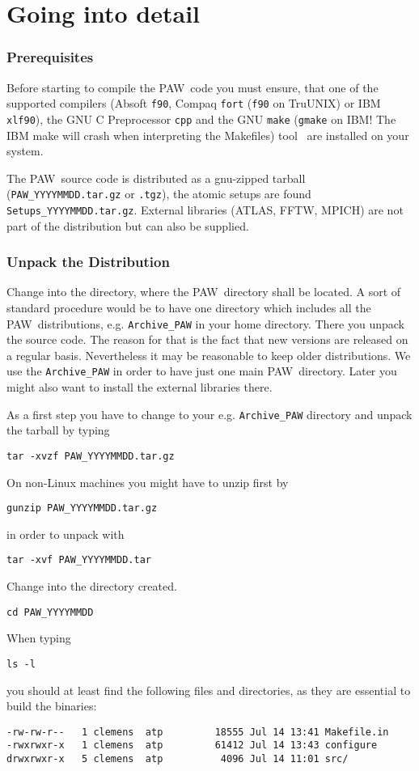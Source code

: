 \documentclass[a4paper,10pt]{article}
\newcommand{\PAW}{\textsc{PAW}}
\begin{document}
\section{Going into detail}

\subsubsection*{Prerequisites}
\label{sub:pre}

Before starting to compile the \PAW\ code you must ensure, that one of the
supported compilers (Absoft \texttt{f90}, Compaq \texttt{fort} (\texttt{f90} on
TruUNIX) or IBM \texttt{xlf90}), the GNU C Preprocessor \texttt{cpp} and the
GNU \texttt{make} (\texttt{gmake} on IBM! The IBM make will crash when
interpreting the Makefiles) tool~\cite{make} are installed on your system.

The \PAW\ source code is distributed as a gnu-zipped tarball
(\texttt{PAW\_YYYYMMDD.tar.gz} or \texttt{.tgz}), the atomic setups are found
\texttt{Setups\_YYYYMMDD.tar.gz}.  External libraries (ATLAS, FFTW, MPICH) are
not part of the distribution but can also be supplied.

\subsubsection*{Unpack the Distribution}
\label{sub:unpack}
Change into the directory, where the \PAW\ directory shall be located.  A sort
of standard procedure would be to have one directory which includes all the
\PAW\ distributions, e.g. \texttt{Archive\_PAW} in your home directory.  There
you unpack the source code.  The reason for that is the fact that new versions
are released on a regular basis. Nevertheless it may be reasonable to keep
older distributions.  We use the \texttt{Archive\_PAW} in order to have just
one main \PAW\ directory.  Later you might also want to install the external
libraries there.


As a first step you have to change to your e.g. \texttt{Archive\_PAW} directory and unpack the tarball by typing
\begin{verbatim}
tar -xvzf PAW_YYYYMMDD.tar.gz
\end{verbatim}
On non-Linux machines you might have to unzip first by
\begin{verbatim}
gunzip PAW_YYYYMMDD.tar.gz
\end{verbatim}
in order to unpack with
\begin{verbatim}
tar -xvf PAW_YYYYMMDD.tar
\end{verbatim}
Change into the directory created.
\begin{verbatim}
cd PAW_YYYYMMDD
\end{verbatim}
When typing
\begin{verbatim}
ls -l
\end{verbatim}
you should at least find the following files and directories, as they are essential to build the binaries:
\begin{verbatim}
-rw-rw-r--   1 clemens  atp         18555 Jul 14 13:41 Makefile.in
-rwxrwxr-x   1 clemens  atp         61412 Jul 14 13:43 configure
drwxrwxr-x   5 clemens  atp          4096 Jul 14 11:01 src/
\end{verbatim}
\end{document}
